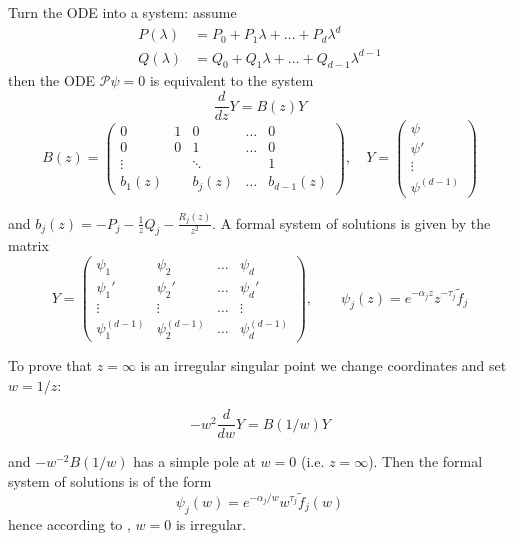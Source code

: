 \documentclass{article}
\theoremstyle{definition}
\newenvironment{verify}{\color{ForestGreen}}{\color{black}}
\begin{document}
\begin{verify}
    Turn the ODE into a system: assume 
    \begin{align*}
P(\lambda) & = P_0 + P_1 \lambda + \ldots + P_d \lambda^d \\
Q(\lambda) & = Q_0 + Q_1 \lambda + \ldots + Q_{d-1} \lambda^{d-1}
\end{align*}
then the ODE $\mathcal{P}\psi=0$ is equivalent to the system 
    \begin{equation}
        \frac{d}{dz}Y= B(z) Y 
    \end{equation}
    \[
    B(z)=\begin{pmatrix}
            0 & 1 & 0 & \ldots & 0 \\
            0 & 0 & 1 & \ldots & 0 \\
            \vdots & &\ddots & & 1\\
            b_{1}(z) & & b_j(z) & \ldots & b_{d-1}(z)
        \end{pmatrix}, \quad Y=\begin{pmatrix}
            \psi \\
            \psi ' \\
            \vdots \\
            \psi^{(d-1)}
        \end{pmatrix}
    \]
    
 and $b_j(z)=-P_j-\frac{1}{z}Q_j-\frac{R_j(z)}{z^2}$. A formal system of solutions is given by the matrix 
\begin{equation}
    Y=\begin{pmatrix}
       \psi_1 & \psi_2 & \ldots & \psi_d  \\
       \psi_1' & \psi_2' & \ldots & \psi_d'  \\
       \vdots & \vdots  & \ldots & \vdots  \\
       \psi_1^{(d-1)} & \psi_2^{(d-1)} & \ldots & \psi_d^{(d-1)} 
    \end{pmatrix}, \qquad \psi_j(z)=e^{-\alpha_j z}z^{-\tau_j}\tilde{f}_j
\end{equation} 

To prove that $z=\infty$ is an irregular singular point we change coordinates and set $w=1/z$:  

 \begin{equation}
        -w^2 \frac{d}{dw}Y= B(1/w) Y 
    \end{equation}

and $-w^{-2}B(1/w)$ has a simple pole at $w=0$ (i.e. $z=\infty$). Then the formal system of solutions is of the form 
\[\psi_j(w)=e^{-\alpha_j/w} w^{\tau_j} \tilde{f}_j(w)\]
hence according to \cite[Definition 3.3.2]{diverg-resurg--ii}, $w=0$ is irregular. 
\end{verify}
\end{document}
